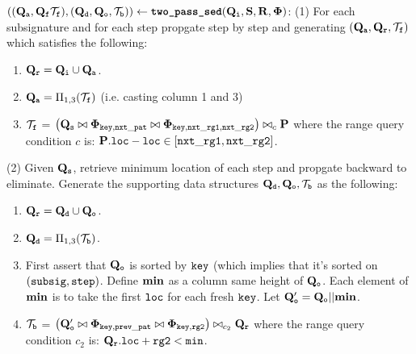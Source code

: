 \begin{small}
\begin{algorithm}[bt]
$\left((\Q{a},\Q{f}\Trans{f}), (\Q{d},\Q{o},\Trans{b}) \right) \leftarrow {\texttt{\textbf{two\_pass\_sed}}}(\Q{i}, \myvec{S}, \myvec{R}, \db)$: 
\newline
(1) For each subsignature and for each step propgate
	step by step and generating $(\Q{a}, \Q{r}, \Trans{f})$
	which satisfies the following:
	\begin{enumerate}
		\item $\Q{r} = \Q{i} \union \Q{a}$.
		\item $\Q{a} = \proj_{1,3}(\Trans{f})$ (i.e. casting column 1 and 3)
		\item $\Trans{f}$ =  
			$\left(\Q{s} \join \db_{\ttt{key},\ttt{nxt\_pat}}
				\join \db_{\ttt{key}, \ttt{nxt\_rg1}, \ttt{nxt\_rg2}} \right)
				\join_{c} \myvec{P}$
			where the range query condition $c$ is:
			$\myvec{P}.\ttt{loc} - \ttt{loc} \in [\ttt{nxt\_rg1},\ttt{nxt\_rg2}]$.
	\end{enumerate}
(2) Given $\Q{s}$, retrieve minimum location of each step and
	propgate backward to eliminate. Generate the supporting
	data structures $\Q{d}, \Q{o}, \Trans{b}$ as the following:
	\begin{enumerate}
		\item $\Q{r} = \Q{d} \union \Q{o}$.
		\item $\Q{d} = \proj_{1,3}(\Trans{b})$.
		\item
			First assert that $\Q{o}$ is sorted by $\ttt{key}$ (which
			implies that it's sorted on $(\ttt{subsig},\ttt{step})$.
			Define $\myvec{min}$ as a column same height of $\Q{o}$.
			Each element of $\myvec{min}$ is to take the first
			$\ttt{loc}$ for each fresh $\ttt{key}$.
			Let $\Q{o}' = \Q{o} \concat \myvec{min}$.
		\item $\Trans{b}$ =  
			$\left(\Q{o}' \join \db_{\ttt{key},\ttt{prev\_pat}}
				\join \db_{\ttt{key}, \ttt{rg2}} \right)
				\join_{c_2} \Q{r}$
			where the range query condition $c_2$ is:
				$\Q{r}.\ttt{loc} + \ttt{rg2} < \ttt{min}$.
	\end{enumerate}

\caption{Two Pass Chunking SED Algorithm}
\label{fig:sed}
\end{algorithm}
\end{small}

